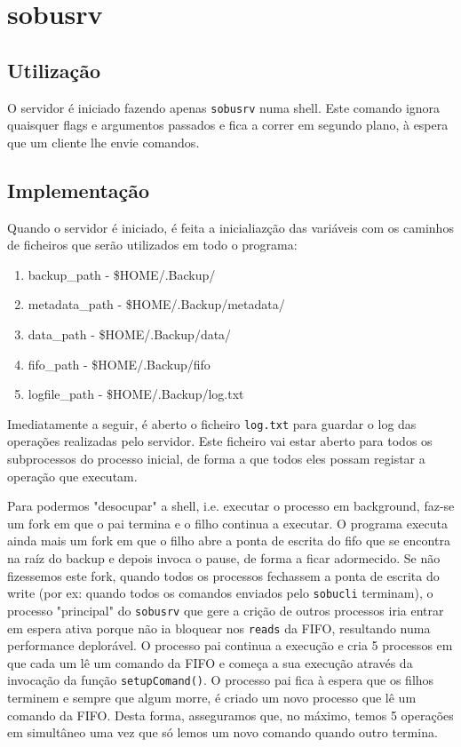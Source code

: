 \section{sobusrv}
\subsection{Utilização}
O servidor é iniciado fazendo apenas \texttt{sobusrv} numa shell. Este comando ignora quaisquer flags e argumentos passados e fica a correr em segundo plano, à 
espera que um cliente lhe envie comandos.
\subsection{Implementação}
Quando o servidor é iniciado, é feita a inicialiazção das variáveis com os caminhos de ficheiros que serão utilizados em todo o programa:
\begin{enumerate}
\item backup_path - \$HOME/.Backup/
\item metadata_path -  \$HOME/.Backup/metadata/
\item data_path - \$HOME/.Backup/data/   
\item fifo_path - \$HOME/.Backup/fifo
\item logfile_path - \$HOME/.Backup/log.txt
\end{enumerate}
	
Imediatamente a seguir, é aberto o ficheiro \texttt{log.txt} para guardar o log das operações realizadas pelo servidor. Este ficheiro vai estar aberto para todos os 
subprocessos do processo inicial, de forma a que todos eles possam registar a operação que executam. 

Para podermos "desocupar" a shell, i.e. executar o processo em 
background, faz-se um fork em que o pai termina e o filho continua a executar. O programa executa ainda mais um fork em que o filho abre a ponta de escrita 
do fifo que se encontra na raíz do backup e depois invoca o pause, de forma a ficar adormecido.  
Se não fizessemos este fork, quando todos os processos fechassem a ponta de escrita do write (por ex: quando todos os comandos enviados pelo 
\texttt{sobucli} terminam), o processo "principal" do \texttt{sobusrv} que gere a crição de outros processos iria entrar em espera ativa porque não ia 
bloquear nos \texttt{reads} da FIFO, resultando numa performance deplorável. O processo pai continua a execução e cria 5 processos em que cada um lê um 
comando da FIFO e começa a sua execução através da invocação da função \texttt{setupComand()}. O processo pai fica à espera que os filhos terminem e sempre que algum
morre, é criado um novo processo que lê um comando da FIFO. Desta forma, asseguramos que, no máximo, temos 5 operações em simultâneo uma vez que só lemos um
novo comando quando outro termina. 

